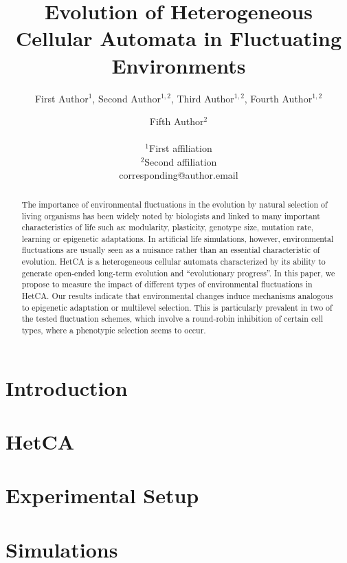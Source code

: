\documentclass[letterpaper]{article}
\title{Evolution of Heterogeneous Cellular Automata in Fluctuating Environments}
\author{First Author$^{1}$, Second Author$^{1,2}$, Third Author$^{1,2}$, Fourth Author$^{1,2}$ \and Fifth Author$^2$ \\
\mbox{}\\
$^1$First affiliation  \\
$^2$Second affiliation \\
corresponding@author.email}
\begin{document}
\maketitle

\begin{abstract}
The importance of environmental fluctuations in the evolution by natural selection of living organisms has been widely noted by biologists and linked to many important characteristics of life such as: modularity, plasticity, genotype size, mutation rate, learning or epigenetic adaptations. In artificial life simulations, however, environmental fluctuations are usually seen as a nuisance rather than an essential characteristic of evolution. HetCA is a heterogeneous cellular automata characterized by its ability to generate open-ended long-term evolution and ``evolutionary progress''. In this paper, we propose to measure the impact of different types of environmental fluctuations in HetCA. Our results indicate that environmental changes induce mechanisms analogous to epigenetic adaptation or multilevel selection. This is particularly prevalent in two of the tested fluctuation schemes, which involve a round-robin inhibition of certain cell types, where a phenotypic selection seems to occur.
\end{abstract}

\section{Introduction}\label{sec:intro}


%

\section{HetCA}\label{sec:hetca)}


\section{Experimental Setup}\label{sec:exsetup}


\section{Simulations}\label{sec:method}

\end{document}
